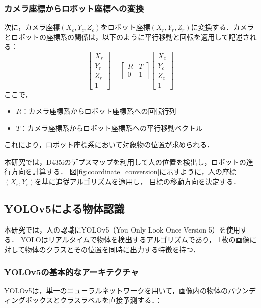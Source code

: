 \subsubsection{カメラ座標からロボット座標への変換}
次に，カメラ座標$(X_c, Y_c, Z_c)$をロボット座標$(X_r, Y_r, Z_r)$に変換する．カメラとロボットの座標系の関係は，以下のように平行移動と回転を適用して記述される：
\begin{equation}
    \begin{bmatrix}
        X_r \\ Y_r \\ Z_r \\ 1
    \end{bmatrix}
    =
    \begin{bmatrix}
        R & T \\
        0 & 1
    \end{bmatrix}
    \begin{bmatrix}
        X_c \\ Y_c \\ Z_c \\ 1
    \end{bmatrix}
\end{equation}
ここで，
\begin{itemize}
    \item $R$：カメラ座標系からロボット座標系への回転行列
    \item $T$：カメラ座標系からロボット座標系への平行移動ベクトル
\end{itemize}

これにより，ロボット座標系において対象物の位置が求められる．

本研究では，D435iのデプスマップを利用して人の位置を検出し，ロボットの進行方向を計算する．
図\ref{fig:coordinate_conversion}に示すように，人の座標$(X_r, Y_r)$を基に追従アルゴリズムを適用し，
目標の移動方向を決定する．


\subsection{YOLOv5による物体認識}
本研究では，人の認識にYOLOv5（You Only Look Once Version 5）を使用する．
YOLOはリアルタイムで物体を検出するアルゴリズムであり，
1枚の画像に対して物体のクラスとその位置を同時に出力する特徴を持つ．

\subsubsection{YOLOv5の基本的なアーキテクチャ}
YOLOv5は，単一のニューラルネットワークを用いて，画像内の物体のバウンディングボックスとクラスラベルを直接予測する．\cite{yolo}：


